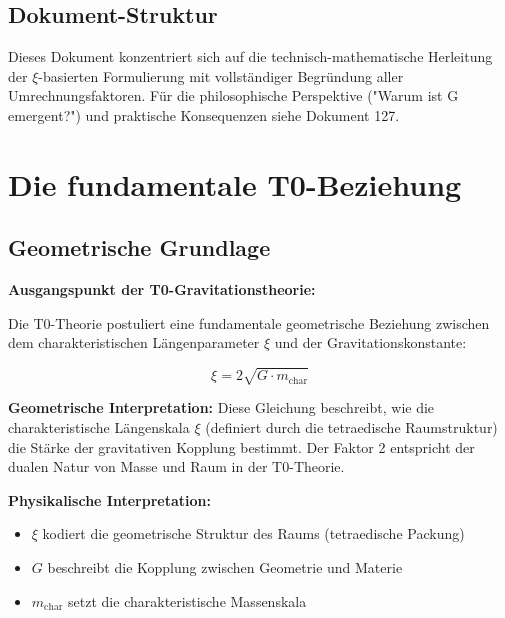 	\subsection{Dokument-Struktur}
	
	Dieses Dokument konzentriert sich auf die technisch-mathematische Herleitung der $\xi$-basierten Formulierung mit vollständiger Begründung aller Umrechnungsfaktoren. Für die philosophische Perspektive ("Warum ist G emergent?") und praktische Konsequenzen siehe Dokument 127.
	
	\section{Die fundamentale T0-Beziehung}
	
	\subsection{Geometrische Grundlage}
	
	\begin{derivation}
		\textbf{Ausgangspunkt der T0-Gravitationstheorie:}
		
		Die T0-Theorie postuliert eine fundamentale geometrische Beziehung zwischen dem charakteristischen Längenparameter $\xi$ und der Gravitationskonstante:
		
		\begin{equation}
			\xi = 2\sqrt{G \cdot m_{\text{char}}}
			\label{eq:t0_fundamental}
		\end{equation}
		
		\textbf{Geometrische Interpretation:} 
		Diese Gleichung beschreibt, wie die charakteristische Längenskala $\xi$ (definiert durch die tetraedische Raumstruktur) die Stärke der gravitativen Kopplung bestimmt. Der Faktor 2 entspricht der dualen Natur von Masse und Raum in der T0-Theorie.
		
		\textbf{Physikalische Interpretation:}
		\begin{itemize}
			\item $\xi$ kodiert die geometrische Struktur des Raums (tetraedische Packung)
			\item $G$ beschreibt die Kopplung zwischen Geometrie und Materie  
			\item $m_{\text{char}}$ setzt die charakteristische Massenskala
		\end{itemize}
	\end{derivation}
	
